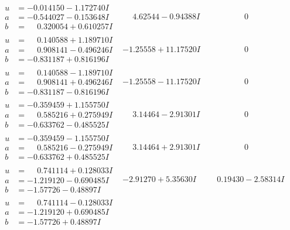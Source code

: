 \documentclass[1p]{elsarticle_modified}
\theoremstyle{definition}
\begin{document}
$$\begin{array}{c|c|c}
\begin{aligned}
u &= -0.014150 - 1.172740 I \\
a &= -0.544027 - 0.153648 I \\
b &= \phantom{-}0.320054 + 0.610257 I\end{aligned}
 & \phantom{-}4.62544 - 0.94388 I & \phantom{-0.000000 } 0 \\ \hline\begin{aligned}
u &= \phantom{-}0.140588 + 1.189710 I \\
a &= \phantom{-}0.908141 - 0.496246 I \\
b &= -0.831187 + 0.816196 I\end{aligned}
 & -1.25558 + 11.17520 I & \phantom{-0.000000 } 0 \\ \hline\begin{aligned}
u &= \phantom{-}0.140588 - 1.189710 I \\
a &= \phantom{-}0.908141 + 0.496246 I \\
b &= -0.831187 - 0.816196 I\end{aligned}
 & -1.25558 - 11.17520 I & \phantom{-0.000000 } 0 \\ \hline\begin{aligned}
u &= -0.359459 + 1.155750 I \\
a &= \phantom{-}0.585216 + 0.275949 I \\
b &= -0.633762 - 0.485525 I\end{aligned}
 & \phantom{-}3.14464 - 2.91301 I & \phantom{-0.000000 } 0 \\ \hline\begin{aligned}
u &= -0.359459 - 1.155750 I \\
a &= \phantom{-}0.585216 - 0.275949 I \\
b &= -0.633762 + 0.485525 I\end{aligned}
 & \phantom{-}3.14464 + 2.91301 I & \phantom{-0.000000 } 0 \\ \hline\begin{aligned}
u &= \phantom{-}0.741114 + 0.128033 I \\
a &= -1.219120 - 0.690485 I \\
b &= -1.57726 - 0.48897 I\end{aligned}
 & -2.91270 + 5.35630 I & \phantom{-}0.19430 - 2.58314 I \\ \hline\begin{aligned}
u &= \phantom{-}0.741114 - 0.128033 I \\
a &= -1.219120 + 0.690485 I \\
b &= -1.57726 + 0.48897 I\end{aligned}

\end{array}$$
\end{document}
